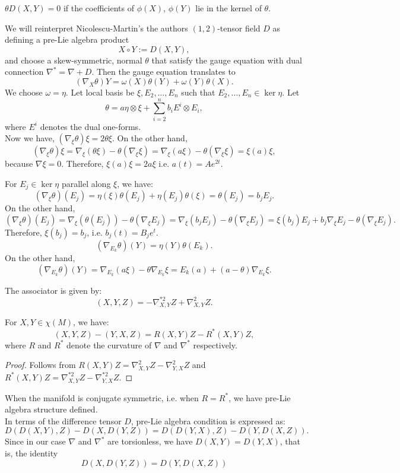 \begin{ex}
$\theta D(X, Y)=0$ if the coefficients of $\phi(X)$, $\phi(Y)$ lie in the kernel of $\theta$.

We will reinterpret Nicolescu-Martin's the authors $(1, 2)$-tensor field $D$ as defining a pre-Lie algebra product
$$X\circ Y := D(X,Y),$$
and choose a skew-symmetric, normal $\theta$ that satisfy the gauge equation with dual connection $\nabla^*=\nabla + D$. Then the gauge equation translates to
$$(\nabla_X\theta)Y=\omega(X)\theta(Y)+\omega(Y)\theta(X).$$
We choose $\omega = \eta$. Let local basis be $\xi, E_2,\ldots, E_n$ such that $E_2,\ldots, E_n\in\ker{\eta}.$ Let
$$\theta=a\eta\otimes\xi+\sum_{i=2}^nb_iE^i\otimes E_i,$$
where $E^i$ denotes the dual one-forms.\\
Now we have, $(\nabla_\xi\theta)\xi=2\theta\xi$. On the other hand, 
$$(\nabla_\xi\theta)\xi=\nabla_\xi(\theta\xi)-\theta(\nabla_\xi\xi)=\nabla_\xi(a\xi)-\theta(\nabla_\xi\xi)=\xi(a)\xi,$$
because $\nabla\xi=0$. Therefore, $\xi(a)\xi=2a\xi$ i.e. $a(t)=Ae^{2t}$.


For $E_j\in\ker{\eta}$ parallel along $\xi$, we have:
$$(\nabla_\xi\theta)(E_j)=\eta(\xi)\theta(E_j)+\eta(E_j)\theta(\xi)=\theta(E_j)=b_jE_j.$$
On the other hand,
$$(\nabla_\xi\theta)(E_j)=\nabla_\xi(\theta(E_j))-\theta(\nabla_\xi E_j)=\nabla_\xi(b_jE_j)-\theta(\nabla_\xi E_j)=\xi(b_j)E_j+b_j\nabla_\xi E_j-\theta(\nabla_\xi E_j).$$
Therefore, $\xi(b_j)=b_j$, i.e. $b_j(t)=B_je^t.$
$$(\nabla_{E_k}\theta)(Y)=\eta(Y)\theta(E_k).$$
On the other hand,
$$(\nabla_{E_k}\theta)(Y)=\nabla_{E_k}(a\xi)-\theta\nabla_{E_k}\xi=E_k(a)+(a-\theta)\nabla_{E_k}\xi.$$
\end{ex}
The associator is given by:
$$(X,Y,Z)=-\nabla^{*2}_{X,Y}Z+\nabla^2_{X,Y}Z.$$
\begin{prop}
For $X,Y\in \chi(M)$, we have:
$$(X,Y,Z)-(Y,X,Z)=R(X,Y)Z-R^*(X,Y)Z,$$
where $R$ and $R^*$ denote the curvature of $\nabla$ and $\nabla^*$ respectively.
\end{prop}
\begin{proof}
Follows from $R(X,Y)Z=\nabla^2_{X,Y}Z-\nabla^2_{Y,X}Z$ and $R^*(X,Y)Z=\nabla^{*2}_{X,Y}Z-\nabla^{*2}_{Y,X}Z.$
\end{proof}
When the manifold is conjugate symmetric, i.e. when $R=R^*$, we have pre-Lie algebra structure defined.\\
In terms of the difference tensor $D$, pre-Lie algebra condition is expressed as:
$$D(D(X,Y),Z)-D(X,D(Y,Z))=D(D(Y,X),Z)-D(Y,D(X,Z)).$$
Since in our case $\nabla$ and $\nabla^*$ are torsionless, we have $D(X,Y)=D(Y,X)$, that is, the identity
$$D(X,D(Y,Z))=D(Y,D(X,Z))$$
